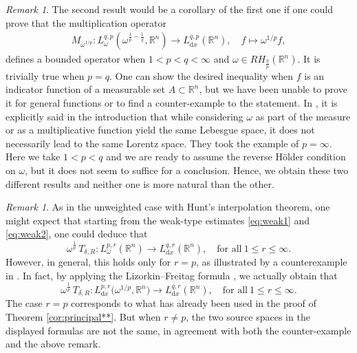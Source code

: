 \documentclass[12pt, letterpaper]{amsart}
\theoremstyle{definition}
\theoremstyle{remark}
\newtheorem{rem}[thm]{Remark}
\numberwithin{equation}{section}
\begin{document}
{\begin{rem}\label{lem:Lorentzs} The second result would be  a corollary of the first one if one could prove that 
     the multiplication operator
    \begin{align*}
        M_{\omega^{1/p}} : L^{q,p}_{\omega}(\omega^{\frac{1}{p} - \frac{1}{q}}, \mathbb{R}^n) 
        \longrightarrow L^{q,p}_{{\mathrm{d}x}}(\mathbb{R}^n), \quad 
        f \longmapsto \omega^{1/p} f,
    \end{align*}
    defines a bounded operator when  $1 < p< q<\infty$ and $\omega \in RH_{\frac{q}{p}}(\mathbb{R}^n)$. It is  trivially true when $p=q$. One can show the desired inequality when $f$ is an indicator function of a measurable set $A \subset \mathbb{R}^n$, but we have been unable to prove it for general functions or to find a counter-example to the statement. In \cite{MR4440073}, it is explicitly said in the introduction that while considering $\omega$ as part of the measure or as a multiplicative function yield the same Lebesgue space,  it does not necessarily lead to the same Lorentz space. They took the example of $p=\infty$.  Here we take $1<p<q$ and we are ready to assume the reverse H\"older condition on $\omega$, but it does not seem to suffice for a conclusion. Hence, we obtain these two different results and neither one is more natural than the other.
\end{rem}



 
\begin{rem}
    As in the unweighted case with Hunt's interpolation theorem, one might expect that starting from the weak-type estimates \eqref{eq:weak1} and \eqref{eq:weak2}, one could deduce that
    \begin{equation*}
        \omega^{\frac{1}{p}} \, T_{\delta,R} : L^{p,r}_\omega(\mathbb{R}^n) \longrightarrow L^{q,r}_{\mathrm{d}x}(\mathbb{R}^n), \quad \text{for all} \ 1\le r \le \infty.
    \end{equation*}
    However, in general, this holds only for $r = p$, as illustrated by a counterexample in \cite{Ferreyra1997}. In fact, by applying the Lizorkin--Freitag formula \cite[Theorem 2]{Freitag1978}, we actually obtain that
     $$ 
     \omega^{\frac{1}{p}} \, T_{\delta,R} : L^{p,r}_{\mathrm{d}x}\big(\omega^{1/p},\mathbb{R}^n\big) \longrightarrow L^{q,r}_{\mathrm{d}x}(\mathbb{R}^n), \quad \text{for all} \ 1\le r \le \infty.$$ 
    The case $r = p$ corresponds to what has already been used in the proof of Theorem \ref{cor:principal**}. But when $r\ne p$, the two source spaces in the displayed formulas are not the same, in agreement with both the counter-example and the above remark.
    \end{rem}









}
\end{document}

